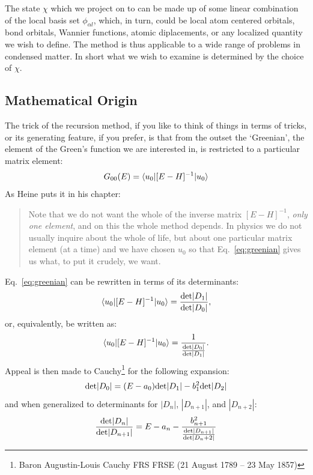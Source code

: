 The state $\chi$ which we project on to can be made up of some linear combination 
of the local basis set $\phi_{\alpha l}$, which, in turn, could be local atom centered orbitals, bond orbitals, 
Wannier functions, atomic diplacements, or any localized quantity we wish to define. The method is thus
applicable to a wide range of problems in condensed matter. In short what we wish to examine
is determined by the choice of $\chi$.

\subsection{Mathematical Origin}
The trick of the recursion method, if you like to think of things in terms of tricks, 
or its generating feature, if you prefer, is that from the outset the `Greenian', the element
of the Green's function we are interested in, is restricted to a particular matrix element: 
%
\begin{equation}
\label{eq:greenian}
G_{00}(E) = \langle u_{0}|[E-H]^{-1}|u_{0}\rangle 
\end{equation}
%
As Heine puts it in his chapter:
%
\begin{quote}
Note that we do not want the whole of the inverse matrix $[E-H]^{-1}$, 
\emph{only one element}, and on this the whole method depends. In physics we do not
usually inquire about the whole of life, but about one particular matrix element (at a time) and we have chosen
$u_{0}$ so that Eq.~\ref{eq:greenian} gives us what, to put it crudely, we want.
\end{quote}

Eq.~\ref{eq:greenian} can be rewritten in terms of its determinants:
%
\begin{equation}
\label{eq:greendet}
\langle u_{0}|[E-H]^{-1}|u_{0}\rangle = \frac{{\rm det}|D_{1}|}{{\rm det}|D_{0}|},
\end{equation}
%
or, equivalently, be written as:
%
\begin{equation}
\label{eq:greendet}
\langle u_{0}|[E-H]^{-1}|u_{0}\rangle = \frac{1}{\frac{{\rm det}|D_{0}|}{{\rm det}|D_{1}|}}.
\end{equation}
%
Appeal is then made to Cauchy\footnote{Baron Augustin-Louis Cauchy FRS FRSE (21 August 1789 – 23 May 1857)} 
for the following expansion:
%
\begin{equation}
{\rm det}|D_{0}| = (E-a_{0}){\rm det}|D_{1}| - b^{2}_{1}{\rm det}|D_{2}|
\end{equation}
%
and when generalized to determinants for $|D_{n}|$, $|D_{n+1}|$, and $|D_{n+2}|$:
%
\begin{equation}
\frac{{\rm det}|D_{n}|}{{\rm det}|D_{n+1}|} = E -a_{n} - \frac{b^{2}_{n+1}}{\frac{{\rm det}|D_{n+1}|}{{\rm det}|D_n+2|}}
\end{equation}

